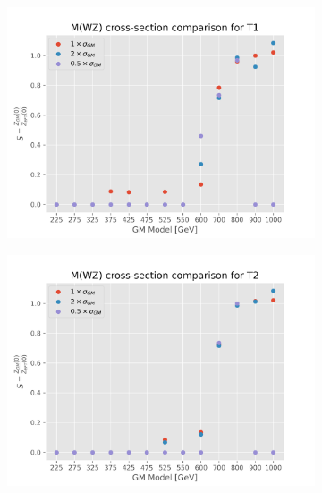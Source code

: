\documentclass[../Bachelorarbeit.tex]{subfiles}
\begin{document}
\begin{figure}[h]
\begin{subfigure}{0.45\textwidth}
    \end{subfigure}
    \begin{subfigure}{0.45\textwidth}
        \includegraphics[width=\textwidth]{Plots/gm_relevanze/MWZ_comparision_T1.png}

    \end{subfigure}
    \begin{subfigure}{0.45\textwidth}
        \includegraphics[width=\textwidth]{Plots/gm_relevanze/MWZ_comparision_T2.png}

    \end{subfigure}

\end{figure}
\end{document}
